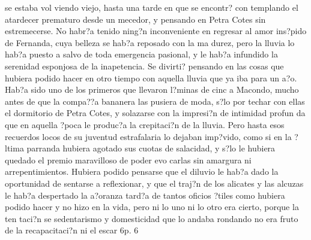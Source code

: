 se estaba vol viendo viejo, hasta una tarde en que se encontr? con templando el atardecer prematuro desde un mecedor, y pensando en Petra Cotes sin estremecerse. No habr?a tenido ning?n inconveniente en regresar al amor ins?pido de Fernanda, cuya belleza se hab?a reposado con la ma durez, pero la lluvia lo hab?a puesto a salvo de toda emergencia pasional, y le hab?a infundido la serenidad esponjosa de la inapetencia. Se divirti? pensando en las cosas que hubiera podido hacer en otro tiempo con aquella lluvia que ya iba para un a?o. Hab?a sido uno de los primeros que llevaron l?minas de cinc a Macondo, mucho antes de que la compa??a bananera las pusiera de moda, s?lo por techar con ellas el dormitorio de Petra Cotes, y solazarse con la impresi?n de intimidad profun da que en aquella ?poca le produc?a la crepitaci?n de la lluvia. Pero hasta esos recuerdos locos de su juventud estrafalaria lo dejaban imp?vido, como si en la ?ltima parranda hubiera agotado sus cuotas de salacidad, y s?lo le hubiera quedado el premio maravilloso de poder evo carlas sin amargura ni arrepentimientos. Hubiera podido pensarse que el diluvio le hab?a dado la oportunidad de sentarse a reflexionar, y que el traj?n de los alicates y las alcuzas le hab?a despertado la a?oranza tard?a de tantos oficios ?tiles como hubiera podido hacer y no hizo en la vida, pero ni lo uno ni lo otro era cierto, porque la ten taci?n se sedentarismo y domesticidad que lo andaba rondando no era fruto de la recapacitaci?n ni el escar 6p. 6

